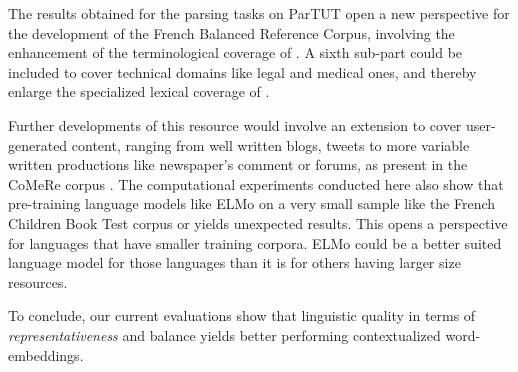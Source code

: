 The results obtained for the parsing tasks on ParTUT open a new perspective for the development of the French Balanced Reference Corpus, involving the enhancement of the terminological coverage of \Cabernet. A sixth sub-part could be included to cover technical domains like legal and medical ones, and thereby enlarge the specialized lexical coverage of \Cabernet.

Further developments of this resource would involve an extension to cover user-generated content, ranging from well written blogs, tweets to more variable written productions like newspaper's comment or forums, as present in the CoMeRe corpus \citep{chanier-etal-2014-the}. The computational experiments conducted here also show that pre-training language models like ELMo on a very small sample like the French Children Book Test corpus or \Cabernet yields unexpected results. This opens a perspective for languages that have smaller training corpora. ELMo could be a better suited language model for those languages than it is for others having larger size resources.

To conclude, our current evaluations show that linguistic quality in terms of \emph{representativeness} and balance yields better performing contextualized word-embeddings.
